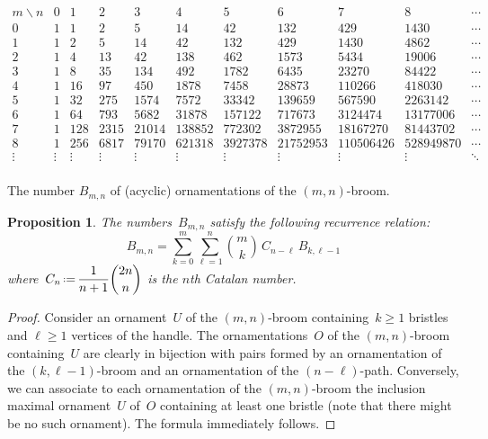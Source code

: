 \documentclass{amsart}
\newtheorem{proposition}[theorem]{Proposition}
\theoremstyle{definition}
\newcommand{\eqdef}{\mbox{\,\raisebox{0.2ex}{\scriptsize\ensuremath{\mathrm:}}\ensuremath{=}\,}} %
\newcommand{\OEIS}[1]{{\rm \href{http://oeis.org/#1}{\texttt{#1}}}}
\begin{document}
\begin{table}
	\[
	\begin{array}{c|ccccccccccc}
	m \backslash n & 0 & 1 & 2 & 3 & 4 & 5 & 6 & 7 & 8 & \cdots \\
	\hline
	0 & 1 & 1 & 2 & 5 & 14 & 42 & 132 & 429 & 1430 & \cdots \\ %
	1 & 1 & 2 & 5 & 14 & 42 & 132 & 429 & 1430 & 4862 & \cdots \\ %
	2 & 1 & 4 & 13 & 42 & 138 & 462 & 1573 & 5434 & 19006 & \cdots \\ %
	3 & 1 & 8 & 35 & 134 & 492 & 1782 & 6435 & 23270 & 84422 & \cdots \\ %
	4 & 1 & 16 & 97 & 450 & 1878 & 7458 & 28873 & 110266 & 418030 & \cdots \\
	5 & 1 & 32 & 275 & 1574 & 7572 & 33342 & 139659 & 567590 & 2263142 & \cdots \\
	6 & 1 & 64 & 793 & 5682 & 31878 & 157122 & 717673 & 3124474 & 13177006 & \cdots \\
	7 & 1 & 128 & 2315 & 21014 & 138852 & 772302 & 3872955 & 18167270 & 81443702 & \cdots \\
	8 & 1 & 256 & 6817 & 79170 & 621318 & 3927378 & 21752953 & 110506426 & 528949870 & \cdots \\ 
	\vdots & \vdots & \vdots & \vdots & \vdots & \vdots & \vdots & \vdots & \vdots & \vdots & \ddots \\
	\end{array}
	\]
	\caption{The number $B_{m,n}$ of (acyclic) ornamentations of the $(m,n)$-broom.}
	\label{tab:broom}
\end{table}

\begin{proposition}
\label{prop:brooms1}
The numbers~$B_{m,n}$ satisfy the following recurrence relation:
\[
B_{m,n} = \sum_{k = 0}^m \sum_{\ell = 1}^n \binom{m}{k} \, C_{n-\ell} \, B_{k,\ell-1}
\]
where~$\displaystyle C_n \eqdef \frac{1}{n+1}\binom{2n}{n}$ is the $n$th Catalan number.
\end{proposition}

\begin{proof}
Consider an ornament~$U$ of the $(m,n)$-broom containing~$k \ge 1$ bristles and $\ell \ge 1$ vertices of the handle.
The ornamentations~$O$ of the $(m,n)$-broom containing~$U$ are clearly in bijection with pairs formed by an ornamentation of the $(k, \ell-1)$-broom and an ornamentation of the $(n-\ell)$-path.
Conversely, we can associate to each ornamentation of the $(m,n)$-broom the inclusion maximal ornament~$U$ of~$O$ containing at least one bristle (note that there might be no such ornament).
The formula immediately follows.
\end{proof}
\end{document}
